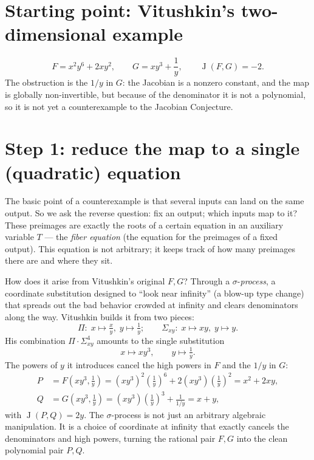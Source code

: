 \documentclass[11pt]{article}
\theoremstyle{plain}
\theoremstyle{definition}
\DeclareMathOperator{\Jdet}{J}
\begin{document}
\section*{Starting point: Vitushkin's two-dimensional example}
\[
  F = x^2y^6+2xy^2,\qquad G = xy^3+\frac{1}{y},\qquad \Jdet(F,G)=-2 .
\]
The obstruction is the $1/y$ in $G$: the Jacobian is a nonzero constant, and
the map is globally non-invertible, but because of the denominator it is not
a polynomial, so it is not yet a counterexample to the Jacobian Conjecture.

\section*{Step 1: reduce the map to a single (quadratic) equation}
The basic point of a counterexample is that several inputs can land on the
same output. So we ask the reverse question: fix an output; which inputs map
to it? These preimages are exactly the roots of a certain equation in an
auxiliary variable $T$ --- the \emph{fiber equation} (the equation for the
preimages of a fixed output). This equation is not arbitrary; it keeps track
of how many preimages there are and where they sit.

How does it arise from Vitushkin's original $F,G$? Through a
$\sigma$-\emph{process}, a coordinate substitution designed to ``look near
infinity'' (a blow-up type change) that spreads out the bad behavior
crowded at infinity and clears denominators along the way. Vitushkin builds
it from two pieces:
\[
  \Pi:\; x\mapsto \tfrac{x}{y},\; y\mapsto \tfrac1y;
  \qquad
  \Sigma_{xy}:\; x\mapsto xy,\; y\mapsto y .
\]
His combination $\Pi\cdot\Sigma_{xy}^4$ amounts to the single substitution
\[
  x\mapsto xy^3,\qquad y\mapsto \tfrac1y .
\]
The powers of $y$ it introduces cancel the high powers in $F$ and the $1/y$
in $G$:
\[
\begin{aligned}
  P &= F\!\left(xy^3,\tfrac1y\right)
     = (xy^3)^2\!\left(\tfrac1y\right)^6+2(xy^3)\!\left(\tfrac1y\right)^2
     = x^2+2xy,\\[2pt]
  Q &= G\!\left(xy^3,\tfrac1y\right)
     = (xy^3)\!\left(\tfrac1y\right)^3+\frac{1}{1/y}
     = x+y,
\end{aligned}
\]
with $\Jdet(P,Q)=2y$. The $\sigma$-process is not just an arbitrary algebraic
manipulation. It is a choice of coordinate at infinity that exactly cancels the
denominators and high powers, turning the rational pair $F,G$ into the clean
polynomial pair $P,Q$.
\end{document}
